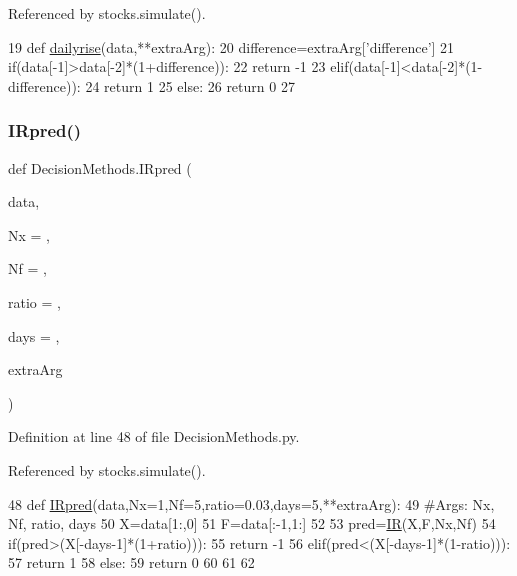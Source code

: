 Referenced by stocks.\+simulate().


\begin{DoxyCode}
19 \textcolor{keyword}{def }\hyperlink{namespaceDecisionMethods_a4cb76bf4e82cc2509499af66f8c816b3}{dailyrise}(data,**extraArg):
20     difference=extraArg[\textcolor{stringliteral}{'difference'}]
21     if(data[-1]>data[-2]*(1+difference)):
22         \textcolor{keywordflow}{return} -1
23     elif(data[-1]<data[-2]*(1-difference)):
24         \textcolor{keywordflow}{return} 1
25     \textcolor{keywordflow}{else}:
26         \textcolor{keywordflow}{return} 0
27 
\end{DoxyCode}
\hypertarget{namespaceDecisionMethods_a6ee6e338ea6a22bd13d5b9767b126f83}{}\label{namespaceDecisionMethods_a6ee6e338ea6a22bd13d5b9767b126f83} 
\subsubsection{\texorpdfstring{I\+Rpred()}{IRpred()}}
{\footnotesize\ttfamily def Decision\+Methods.\+I\+Rpred (\begin{DoxyParamCaption}\item[{}]{data,  }\item[{}]{Nx = {},  }\item[{}]{Nf = {},  }\item[{}]{ratio = {},  }\item[{}]{days = {},  }\item[{}]{extra\+Arg }\end{DoxyParamCaption})}



Definition at line 48 of file Decision\+Methods.\+py.



Referenced by stocks.\+simulate().


\begin{DoxyCode}
48 \textcolor{keyword}{def }\hyperlink{namespaceDecisionMethods_a6ee6e338ea6a22bd13d5b9767b126f83}{IRpred}(data,Nx=1,Nf=5,ratio=0.03,days=5,**extraArg):
49     \textcolor{comment}{#Args: Nx, Nf, ratio, days}
50     X=data[1:,0]
51     F=data[:-1,1:]
52 
53     pred=\hyperlink{namespaceIR}{IR}(X,F,Nx,Nf)
54     if(pred>(X[-days-1]*(1+ratio))):
55         \textcolor{keywordflow}{return} -1
56     elif(pred<(X[-days-1]*(1-ratio))):
57         \textcolor{keywordflow}{return} 1
58     \textcolor{keywordflow}{else}:
59         \textcolor{keywordflow}{return} 0
60 
61     
62 \end{DoxyCode}
\hypertarget{namespaceDecisionMethods_a856437b184fc8efd2df5f7fe1ba3644d}{}\label{namespaceDecisionMethods_a856437b184fc8efd2df5f7fe1ba3644d} 
